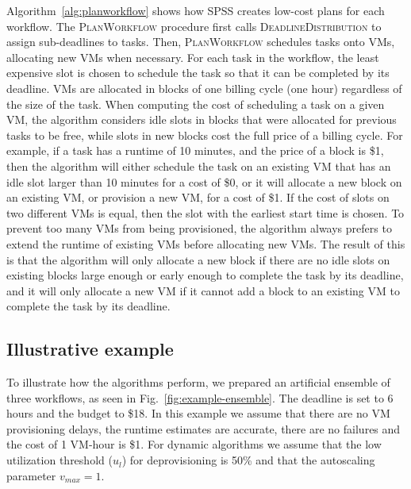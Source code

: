 \documentclass[preprint,5p]{elsarticle}
\begin{document}
Algorithm~\ref{alg:planworkflow} shows how SPSS creates low-cost plans for each
workflow. The \textsc{PlanWorkflow} procedure first calls
\textsc{DeadlineDistribution} to assign sub-deadlines to tasks.
Then, \textsc{PlanWorkflow} schedules
tasks onto VMs, allocating new VMs when necessary. For each task in the
workflow, the least expensive slot is chosen to schedule the task so that it can
be completed by  its deadline. VMs are allocated in blocks of one billing cycle
(one hour) regardless of the size of the task. When computing the cost of
scheduling a task on a given VM, the algorithm considers idle slots in blocks
that were allocated for previous tasks to be free, while slots in new blocks
cost the full price of a billing cycle. 
For example, if a task has a runtime of
10 minutes, and the price of a block is \$1, then the algorithm will either
schedule the task on an existing VM that has an idle slot larger than 10
minutes for a cost of \$0, or it will allocate a new block on an existing VM,
or provision a new VM, for a cost of \$1. 
If the cost of slots on two different
VMs is equal, then the slot with the earliest start time is chosen. To prevent too
many VMs from being provisioned, the algorithm always prefers to extend the
runtime of existing VMs before allocating new VMs. The result of this is that
the algorithm will only allocate a new block if there are no idle slots on
existing blocks large enough or early enough to complete the task by its
deadline, and it will only allocate a new VM if it cannot add a block to an
existing VM to complete the task by its deadline.



\subsection{Illustrative example}

To illustrate how the algorithms perform, we prepared an artificial ensemble 
of three workflows, as seen in Fig.~\ref{fig:example-ensemble}. 
The deadline is set to 6 hours and the budget to \$18. In this example we assume
that there are no VM provisioning delays, the runtime estimates are accurate, 
there are no failures and the cost of 1 VM-hour is \$1.
For dynamic algorithms we assume that the low utilization threshold ($u_l$) for deprovisioning is 50\%
and that the autoscaling parameter $v_{max} = 1$. 
\end{document}
